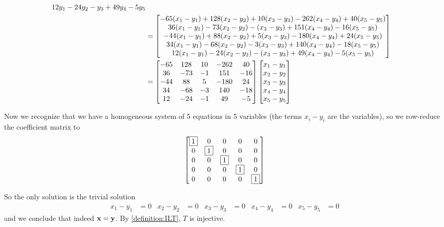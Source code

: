 \documentclass{ximera}
\begin{document}
\begin{example}[Injective]
\begin{align*}
{12 y_1 - 24 y_2 - y_3 + 49 y_4 - 5 y_5}\\
&=
\begin{bmatrix}-65 (x_1-y_1) + 128 (x_2-y_2) + 10 (x_3-y_3) - 262 (x_4-y_4) + 40 (x_5-y_5)\\
36 (x_1-y_1) - 73 (x_2-y_2) - (x_3-y_3) + 151 (x_4-y_4) - 16 (x_5-y_5)\\
-44 (x_1-y_1) + 88 (x_2-y_2) + 5 (x_3-y_3) - 180 (x_4-y_4) + 24 (x_5-y_5)\\
34 (x_1-y_1) - 68 (x_2-y_2) - 3 (x_3-y_3) + 140 (x_4-y_4) - 18 (x_5-y_5)\\
12 (x_1-y_1) - 24 (x_2-y_2) - (x_3-y_3) + 49 (x_4-y_4) - 5 (x_5-y_5)\end{bmatrix}\\
&=
\begin{bmatrix}
-65&128&10&-262&40\\
36&-73&-1&151&-16\\
-44&88&5&-180&24\\
34&-68&-3&140&-18\\
12&-24&-1&49&-5
\end{bmatrix}
\begin{bmatrix}x_1-y_1\\x_2-y_2\\x_3-y_3\\x_4-y_4\\x_5-y_5\end{bmatrix}
\end{align*}


Now we recognize that we have a homogeneous system of 5 equations in 5 variables (the terms $x_i-y_i$ are the variables), so we row-reduce the coefficient matrix to
\[
\begin{bmatrix}
\fbox{1}&0&0&0&0\\
0&\fbox{1}&0&0&0\\
0&0&\fbox{1}&0&0\\
0&0&0&\fbox{1}&0\\
0&0&0&0&\fbox{1}
\end{bmatrix}
\]




So the only solution is the trivial solution
\begin{align*}
x_1-y_1&=0&x_2-y_2&=0&x_3-y_3&=0&x_4-y_4&=0&x_5-y_5&=0
\end{align*}
and we conclude that indeed $\mathbf{x}=\mathbf{y}$.  By \ref{definition:ILT}, $T$ is injective.

\end{example}
\end{document}
